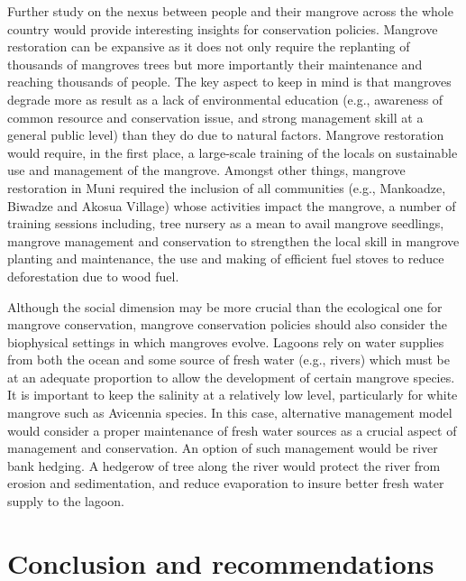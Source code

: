 \documentclass[12pt,oneside,preprint,3p,authoryear,times]{elsarticle} %
\begin{document}
Further study on the nexus between people and their mangrove across the
whole country would provide interesting insights for conservation
policies. Mangrove restoration can be expansive as it does not only
require the replanting of thousands of mangroves trees but more
importantly their maintenance and reaching thousands of people. The key
aspect to keep in mind is that mangroves degrade more as result as a
lack of environmental education (e.g., awareness of common resource and
conservation issue, and strong management skill at a general public
level) than they do due to natural factors. Mangrove restoration would
require, in the first place, a large-scale training of the locals on
sustainable use and management of the mangrove. Amongst other things,
mangrove restoration in Muni required the inclusion of all communities
(e.g., Mankoadze, Biwadze and Akosua Village) whose activities impact
the mangrove, a number of training sessions including, tree nursery as a
mean to avail mangrove seedlings, mangrove management and conservation
to strengthen the local skill in mangrove planting and maintenance, the
use and making of efficient fuel stoves to reduce deforestation due to
wood fuel.

Although the social dimension may be more crucial than the ecological
one for mangrove conservation, mangrove conservation policies should
also consider the biophysical settings in which mangroves evolve.
Lagoons rely on water supplies from both the ocean and some source of
fresh water (e.g., rivers) which must be at an adequate proportion to
allow the development of certain mangrove species. It is important to
keep the salinity at a relatively low level, particularly for white
mangrove such as Avicennia species. In this case, alternative management
model would consider a proper maintenance of fresh water sources as a
crucial aspect of management and conservation. An option of such
management would be river bank hedging. A hedgerow of tree along the
river would protect the river from erosion and sedimentation, and reduce
evaporation to insure better fresh water supply to the lagoon.

\hypertarget{conclusion-and-recommendations}{%
\section*{Conclusion and
recommendations}\label{conclusion-and-recommendations}}
\end{document}
